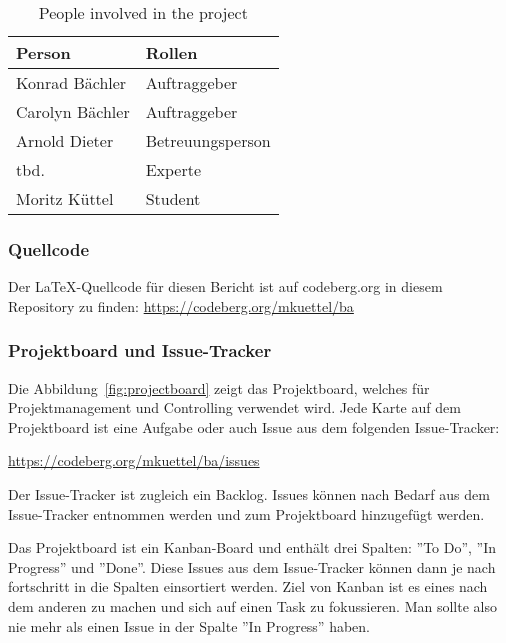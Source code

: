 \begin{table}[H]
    \begin{tabular}{l p{3.2cm}}
        \toprule
        \bfseries Person   & \bfseries Rollen \\
        \midrule
        Konrad Bächler     & Auftraggeber \\
        \midrule
        Carolyn Bächler    & Auftraggeber \\
        \midrule
        Arnold Dieter      & Betreuungsperson \\
        \midrule
        tbd.               & Experte \\
        \midrule
        Moritz Küttel      & Student \\
        \bottomrule
    \end{tabular}
    \caption{People involved in the project}\label{tab:projectmembers}
\end{table}

\subsubsection{Quellcode}

Der \LaTeX-Quellcode für diesen Bericht ist auf codeberg.org in diesem Repository zu finden:
\url{https://codeberg.org/mkuettel/ba}


\subsubsection{Projektboard und Issue-Tracker}

Die Abbildung~\ref{fig:projectboard} zeigt das Projektboard, welches für Projektmanagement und Controlling verwendet wird.
Jede Karte auf dem Projektboard ist eine Aufgabe oder auch Issue aus dem folgenden Issue-Tracker:

\url{https://codeberg.org/mkuettel/ba/issues}

Der Issue-Tracker ist zugleich ein Backlog. Issues können nach Bedarf aus dem Issue-Tracker entnommen werden und zum Projektboard hinzugefügt werden.

Das Projektboard ist ein Kanban-Board und enthält drei Spalten: ''To Do'', ''In Progress'' und ''Done''.
Diese Issues aus dem Issue-Tracker können dann je nach fortschritt in die Spalten einsortiert werden. 
Ziel von Kanban ist es eines nach dem anderen zu machen und sich auf einen Task zu fokussieren. Man sollte also nie mehr als einen Issue in der Spalte ''In Progress'' haben.

